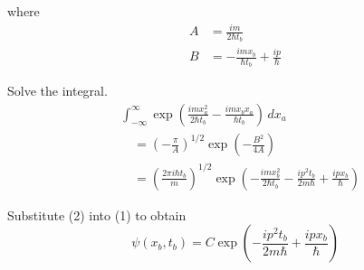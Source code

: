 \documentclass[12pt]{article}
\begin{document}
where
\begin{align*}
A&=\frac{im}{2\hbar t_b}
\\
B&=-\frac{imx_b}{\hbar t_b}+\frac{ip}{\hbar}
\end{align*}

Solve the integral.
\begin{align*}
&\int_{-\infty}^\infty
\exp\left(\frac{imx_a^2}{2\hbar t_b}-\frac{imx_bx_a}{\hbar t_b}\right)\,dx_a
\\
&\quad{}=\left(-\frac{\pi}{A}\right)^{1/2}\exp\left(-\frac{B^2}{4A}\right)
\\
&\quad{}=\left(\frac{2\pi i\hbar t_b}{m}\right)^{1/2}
\exp\left(-\frac{i m x_b^2}{2\hbar t_b}-\frac{ip^2t_b}{2m\hbar}+\frac{ipx_b}{\hbar}\right)
\tag{2}
\end{align*}

Substitute (2) into (1) to obtain
\begin{equation*}
\psi(x_b,t_b)
=C\exp\left(-\frac{ip^2t_b}{2m\hbar}+\frac{ipx_b}{\hbar}\right)
\tag{3}
\end{equation*}
\end{document}

